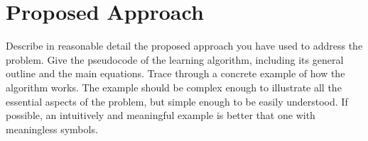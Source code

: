 
\chapter{Proposed Approach}\label{ch:contribution}

Describe in reasonable detail the proposed approach you have used to
address the problem. Give the pseudocode of the learning algorithm,
including its general outline and the main equations. Trace through a
concrete example of how the algorithm works. The example should be
complex enough to illustrate all the essential aspects of the problem,
but simple enough to be easily understood. If possible, an intuitively
and meaningful example is better that one with meaningless symbols.